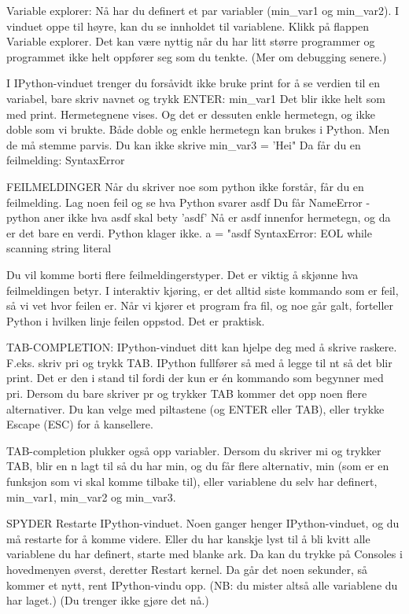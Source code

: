 \documentclass[a4paper,11pt,utf8]{book}
\begin{document}
Variable explorer:
Nå har du definert et par variabler (min_var1 og min_var2).
I vinduet oppe til høyre, kan du se innholdet til variablene. 
Klikk på flappen Variable explorer.
Det kan være nyttig når du har litt større programmer og programmet ikke helt
oppfører seg som du tenkte.
(Mer om debugging senere.) 


I IPython-vinduet trenger du forsåvidt ikke bruke print for å se verdien
til en variabel, bare skriv navnet og trykk ENTER: 
min_var1
Det blir ikke helt som med print. Hermetegnene vises.
Og det er dessuten enkle hermetegn, og ikke doble som vi brukte.
Både doble og enkle hermetegn kan brukes i Python. 
Men de må stemme parvis. Du kan ikke skrive
min_var3 = 'Hei"
Da får du en feilmelding: SyntaxError 



FEILMELDINGER
Når du skriver noe som python ikke forstår, får du en feilmelding. 
Lag noen feil og se hva Python svarer
asdf
Du får NameError - python aner ikke hva asdf skal bety 
'asdf'
Nå er asdf innenfor hermetegn, og da er det bare en verdi. Python klager ikke.
a = "asdf
SyntaxError: EOL while scanning string literal

Du vil komme borti flere feilmeldingerstyper. 
Det er viktig å skjønne hva feilmeldingen betyr.  
I interaktiv kjøring, er det alltid siste kommando som er feil, så vi vet hvor feilen er. 
Når vi kjører et program fra fil, og noe går galt, forteller Python i hvilken linje
feilen oppstod. Det er praktisk. 


TAB-COMPLETION: 
IPython-vinduet ditt kan hjelpe deg med å skrive raskere.
F.eks. skriv pri og trykk TAB. IPython fullfører så med å legge til nt så det blir print.
Det er den i stand til fordi der kun er én kommando som begynner med pri.
Dersom du bare skriver pr og trykker TAB kommer det opp noen flere alternativer.
Du kan velge med piltastene (og ENTER eller TAB), eller trykke Escape (ESC) for å kansellere.

TAB-completion plukker også opp variabler.
Dersom du skriver mi og trykker TAB, blir en n lagt til så du har min,
og du får flere alternativ, min (som er en funksjon som vi skal komme tilbake til),
eller variablene du selv har definert, min_var1, min_var2 og min_var3.






SPYDER
Restarte IPython-vinduet.
Noen ganger henger IPython-vinduet, og du må restarte for å komme videre.
Eller du har kanskje lyst til å bli kvitt alle variablene du har definert,
starte med blanke ark. 
Da kan du trykke på Consoles i hovedmenyen øverst, deretter Restart kernel. 
Da går det noen sekunder, så kommer et nytt, rent IPython-vindu opp.
(NB: du mister altså alle variablene du har laget.) 
(Du trenger ikke gjøre det nå.)
\end{document}
